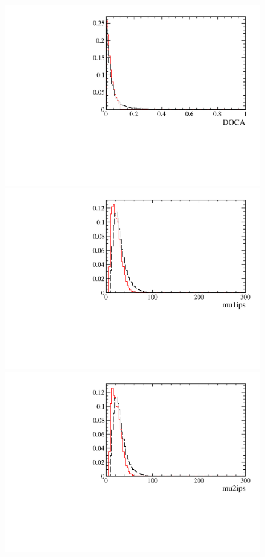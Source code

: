 \begin{figure} [htb!]
\begin{center}
\includegraphics[scale=0.20]{figs/DOCAPARTIALptcut.pdf}
\includegraphics[scale=0.20]{figs/mu1ipsPARTIALptcut.pdf}
\includegraphics[scale=0.20]{figs/mu2ipsPARTIALptcut.pdf}

\end{center}
\end{figure}
